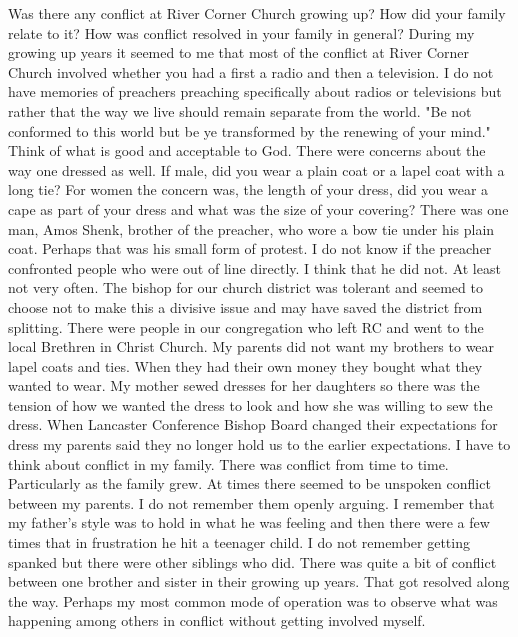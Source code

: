 Was there any conflict at River Corner Church growing up? How did your family relate to it? How was conflict resolved in your family in general?
During my growing up years it seemed to me that most of the conflict at River Corner Church involved whether you had a first a radio and then a television. I do not have memories of preachers preaching specifically about radios or televisions but rather that the way we live should remain separate from the world. "Be not conformed to this world but be ye transformed by the renewing of your mind." Think of what is good and acceptable to God. 
There were concerns about the way one dressed as well. If male, did you wear a plain coat or a lapel coat with a long tie? For women the concern was, the length of your dress, did you wear a cape as part of your dress and what was the size of your covering?
There was one man, Amos Shenk, brother of the preacher, who wore a bow tie under his plain coat. Perhaps that was his small form of protest.
I do not know if the preacher confronted people who were out of line directly. I think that he did not. At least not very often. The bishop for our church district was tolerant and seemed to choose not to make this a divisive issue and may have saved the district from splitting. There were people in our congregation who left RC and went to the local Brethren in Christ Church.
My parents did not want my brothers to wear lapel coats and ties. When they had their own money they bought what they wanted to wear. My mother sewed dresses for her daughters so there was the tension of how we wanted the dress to look and how she was willing to sew the dress. When Lancaster Conference Bishop Board changed their expectations for dress my parents said they no longer hold us to the earlier expectations.
I have to think about conflict in my family. There was conflict from time to time. Particularly as the family grew. At times there seemed to be unspoken conflict between my parents. I do not remember them openly arguing. I remember that my father's style was to hold in what he was feeling and then there were a few times that in frustration he hit a teenager child. I do not remember getting spanked but there were other siblings who did. There was quite a bit of conflict between one brother and sister in their growing up years. That got resolved along the way. Perhaps my most common mode of operation was to observe what was happening among others in conflict without getting involved myself.




